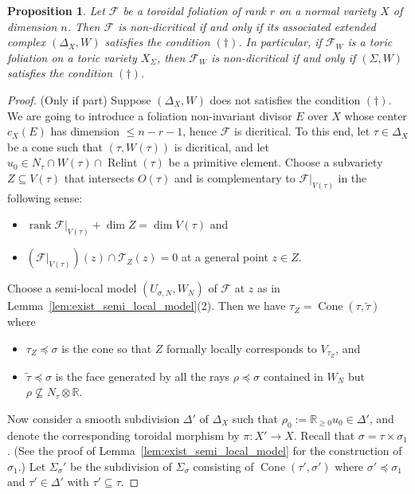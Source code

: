 \documentclass[12pt,reqno]{amsart}
\newtheorem{proposition}[theorem]{Proposition}
\theoremstyle{definition}
\newcommand{\on}{\operatorname}
\newcommand\cF{{\mathcal{F}}}
\newcommand\cT{{\mathcal{T}}}
\newcommand\bR{{\mathbb R}}
\begin{document}
\begin{proposition}\label{ND_toroidal}
    Let $\cF$ be a toroidal foliation of rank $r$ on a normal variety $X$ of dimension $n$.
    Then $\cF$ is non-dicritical if and only if its associated extended complex $(\Delta_X,W)$ satisfies the condition $(\dagger)$. 
    In particular, if $\cF_W$ is a toric foliation on a toric variety $X_\Sigma$, then $\cF_W$ is non-dicritical if and only if $(\Sigma,W)$ satisfies the condition $(\dagger)$. 
\end{proposition}
\begin{proof}
    (Only if part) 
    Suppose $(\Delta_X,W)$ does not satisfies the condition $(\dagger)$. We are going to introduce a foliation non-invariant divisor $E$ over $X$ whose center $c_X(E)$ has dimension $\leq n-r-1$, hence $\cF$ is dicritical. To this end, let $\tau\in \Delta_X$ be a cone such that $(\tau,W(\tau))$ is dicritical, and let $u_0\in N_\tau\cap W(\tau)\cap\on{Relint}(\tau)$ be a primitive element. Choose a subvariety $Z\subseteq V(\tau)$ that intersects $O(\tau)$ and is complementary to $\cF\vert_{V(\tau)}$ in the following sense: 
    \begin{itemize}
        \item $\on{rank}\cF\vert_{V(\tau)} + \dim Z = \dim V(\tau)$ and 
        \item $(\cF\vert_{V(\tau)})(z)\cap \cT_Z(z)=0$ at a general point $z\in Z$.
    \end{itemize}
    Choose a semi-local model $(U_{\sigma,N},W_N)$ of $\cF$ at $z$ as in Lemma~\ref{lem:exist_semi_local_model}(2). Then we have $\tau_Z=\on{Cone}(\tau,\widetilde\tau)$ where 
    \begin{itemize}
        \item $\tau_Z\preceq\sigma$ is the cone so that $Z$ formally locally corresponds to $V_{\tau_Z}$, and 
        \item $\widetilde{\tau}\preceq\sigma$ is the face generated by all the rays $\rho\preceq\sigma$ contained in $W_N$ but $\rho\nsubseteq N_\tau\otimes\bR$.
    \end{itemize}
    Now consider a smooth subdivision $\Delta'$ of $\Delta_X$ such that $\rho_0:=\bR_{\geq 0}u_0\in\Delta'$, and denote the corresponding toroidal morphism by $\pi\colon X'\to X$. 
    Recall that $\sigma = \tau\times\sigma_1$. (See the proof of Lemma~\ref{lem:exist_semi_local_model} for the construction of $\sigma_1$.) 
    Let $\Sigma_\sigma'$ be the subdivision of $\Sigma_{\sigma}$ consisting of $\on{Cone}(\tau',\sigma')$ where $\sigma'\preceq\sigma_1$ and $\tau'\in \Delta'$ with $\tau'\subseteq \tau$. 

\end{proof}
\end{document}
